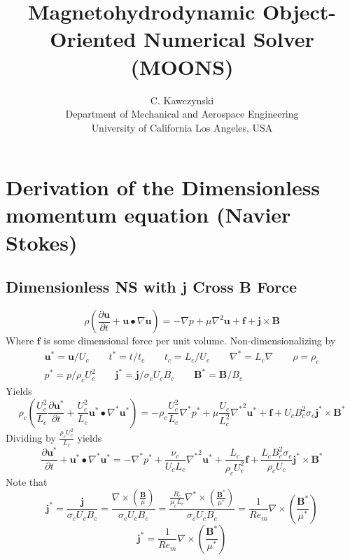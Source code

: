 \documentclass[11pt]{article}
\newcommand{\B}{\mathbf{B}}
\renewcommand{\U}{\mathbf{u}}
\newcommand{\PD}{\partial}
\newcommand{\J}{\mathbf{j}}
\newcommand{\F}{\mathbf{f}}
\begin{document}
\doublespacing
\title{Magnetohydrodynamic Object-Oriented Numerical Solver (MOONS)}
\author{C. Kawczynski \\
Department of Mechanical and Aerospace Engineering \\
University of California Los Angeles, USA\\
}
\maketitle

\section{Derivation of the Dimensionless momentum equation (Navier Stokes)}
\subsection{Dimensionless NS with j Cross B Force}
\begin{equation}
	\rho \left( \frac{\PD \U}{\PD t} + \U \bullet \nabla \U \right) =
	-\nabla p + \mu \nabla^2 \U + \F + \J \times \B
\end{equation}
Where $\F$ is some dimensional force per unit volume. Non-dimensionalizing by
\begin{equation}\begin{aligned}
	\U^* = \U/U_c \qquad
	t^* = t/t_c \qquad
	t_c = L_c/U_c \qquad
	\nabla^* = L_c \nabla \qquad
	\rho = \rho_c \\
	p^* = p/\rho_c U_c^2 \qquad
	\J^* = \J/ \sigma_c U_c B_c \qquad
	\B^* = \B/B_c
\end{aligned}\end{equation}
Yields
\begin{equation}
	\rho_c \left( \frac{U_c^2}{L_c} \frac{\PD \U^*}{\PD t} + \frac{U_c^2}{L_c} \U^* \bullet \nabla^* \U^* \right) =
	- \rho_c \frac{U_c^2}{L_c} \nabla^*  p^* + \mu \frac{U_c}{L_c^2} {\nabla^*}^2 \U^* + \F +
	U_c B_c^2 \sigma_c \J^* \times \B^*
\end{equation}
Dividing by $\frac{\rho_c U_c^2}{L_c}$ yields
\begin{equation}
	\frac{\PD \U^*}{\PD t} + \U^* \bullet \nabla^* \U^* =
	- \nabla^*  p^* +
	\frac{\nu_c}{U_c L_c} {\nabla^*}^2 \U^* + \frac{L_c}{\rho_c U_c^2} \F +
	\frac{L_c B_c^2 \sigma_c}{\rho_c U_c} \J^* \times \B^*
\end{equation}
Note that
\begin{equation}
	\J^* =
	\frac{\J}{\sigma_c U_c B_c} =
	\frac{\nabla \times \left( \frac{\B}{\mu} \right)}{\sigma_c U_c B_c} =
	\frac{ \frac{B_c}{\mu_c L_c} \nabla^* \times \left( \frac{\B^*}{\mu^*} \right)}{\sigma_c U_c B_c} =
	\frac{1}{Re_m} \nabla \times \left( \frac{\B^*}{\mu^*} \right)
\end{equation}
\begin{equation}
\boxed{ \J^* = \frac{1}{Re_m} \nabla \times \left( \frac{\B^*}{\mu^*} \right) }
\end{equation}
\end{document}
